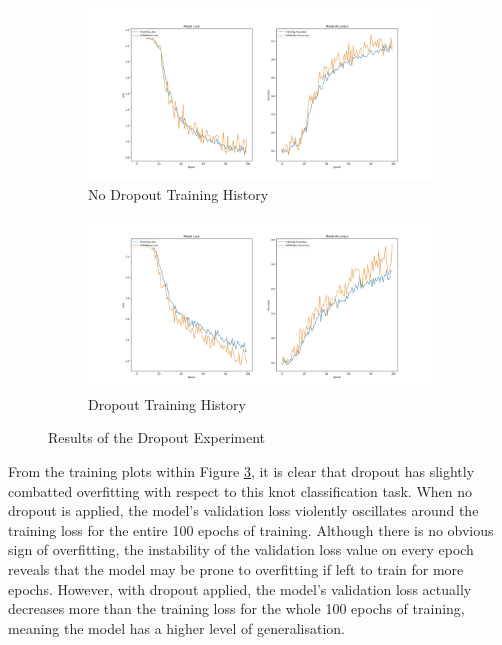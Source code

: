 \documentclass{l4proj}
\begin{document}
\begin{figure}[h]
	\begin{subfigure}{\textwidth}
		\centering
        \includegraphics[width=\linewidth]{eval/noDropouttrainingHistory}
        \caption{No Dropout Training History}
        \label{fig:NoDropoutExperiment}
	\end{subfigure}
	\begin{subfigure}{\textwidth}
		\centering
        \includegraphics[width=\linewidth]{eval/AugtrainingHistory}
        \caption{Dropout Training History}
        \label{fig:DropoutExperiment}
	\end{subfigure}
	\caption{Results of the Dropout Experiment}
    \label{fig:DropoutExperimentResults}
\end{figure}

From the training plots within Figure \ref{fig:DropoutExperimentResults}, it is clear that dropout has slightly combatted overfitting with respect to this knot classification task. When no dropout is applied, the model's validation loss violently oscillates around the training loss for the entire 100 epochs of training. Although there is no obvious sign of overfitting, the instability of the validation loss value on every epoch reveals that the model may be prone to overfitting if left to train for more epochs. However, with dropout applied, the model's validation loss actually decreases more than the training loss for the whole 100 epochs of training, meaning the model has a higher level of generalisation.
\end{document}
